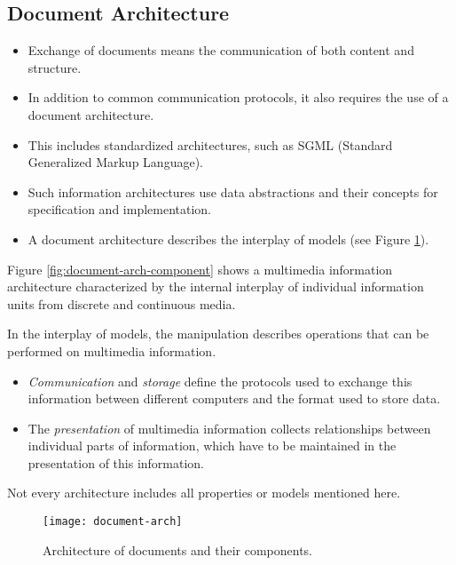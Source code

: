 \subsection{Document Architecture}
\begin{itemize}
	\item Exchange of documents means the communication of both content and structure. 
	\item In addition to common communication protocols, it also requires the use of a document architecture. 
	\item This includes standardized architectures, such as SGML (Standard Generalized Markup Language).
	\item Such information architectures use data abstractions and their concepts for specification and implementation. 
	\item A document architecture describes the interplay of models (see Figure {\ref{fig:document-arch}}).
\end{itemize}


Figure {\ref{fig:document-arch-component}} shows a multimedia information architecture characterized by the internal interplay of individual information units from discrete and continuous media.


In the interplay of models, the manipulation describes operations that can be performed on multimedia information. 
\begin{itemize}
	\item \textit{Communication} and \textit{storage} define the protocols used to exchange this information between different computers and the format used to store data.
	\item The \textit{presentation} of multimedia information collects relationships between individual parts of information, which have to be maintained in the presentation of this information. 
\end{itemize}

Not every architecture includes all properties or models mentioned here.




\begin{figure}[ht!]
	\centering
	\texttt{[image: document-arch]}
	\caption{Architecture of documents and their components.}{\label{fig:document-arch}}
\end{figure}

